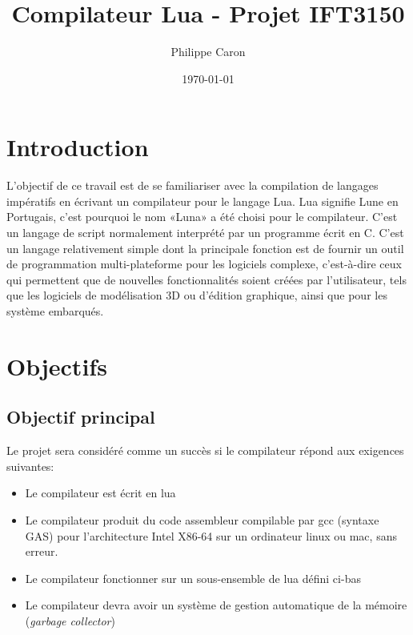 \documentclass{article}
\title{Compilateur Lua - Projet IFT3150}
\date{\today}
\author{Philippe Caron}
\begin{document}
\maketitle
\section{Introduction}
L'objectif de ce travail est de se familiariser avec la compilation de langages impératifs en écrivant un compilateur pour le langage Lua. Lua signifie Lune en Portugais, c'est pourquoi le nom «Luna» a été choisi pour le compilateur. C'est un langage de script normalement interprété par un programme écrit en C. C'est un langage relativement simple dont la principale fonction est de fournir un outil de programmation multi-plateforme pour les logiciels complexe, c'est-à-dire ceux qui permettent que de nouvelles fonctionnalités soient créées par l'utilisateur, tels que les logiciels de modélisation 3D ou d'édition graphique, ainsi que pour les système embarqués. 

\section{Objectifs}

\subsection{Objectif principal}
Le projet sera considéré comme un succès si le compilateur répond aux exigences suivantes:
\begin{itemize}
\item Le compilateur est écrit en lua
\item Le compilateur produit du code assembleur compilable par gcc (syntaxe GAS) pour l'architecture Intel X86-64 sur un ordinateur linux ou mac, sans erreur.
\item Le compilateur fonctionner sur un sous-ensemble de lua défini ci-bas
\item Le compilateur devra avoir un système de gestion automatique de la mémoire (\textit{garbage collector})
\end{itemize}
\end{document}
